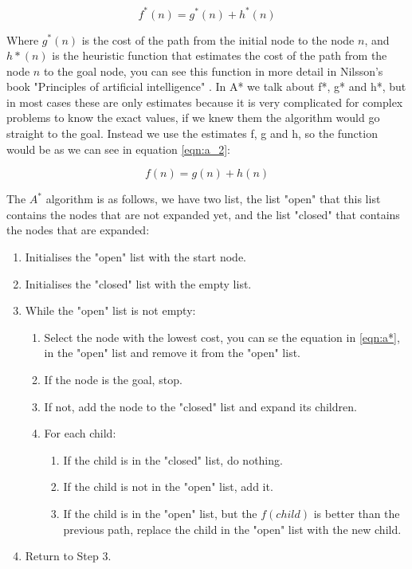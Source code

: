 \documentclass[runningheads]{llncs}
\begin{document}
\begin{equation}\label{eqn:a*}
f^*(n) = g^*(n) + h^*(n)
\end{equation}

Where \(g^*(n)\) is the cost of the path from the initial node to the node \(n\), and \(h*(n)\) is the heuristic function that estimates the cost of the path from the node \(n\) to the goal node, you can see this function in more detail in Nilsson's book "Principles of artificial intelligence" \cite{algorithms_4}.
In A* we talk about f*, g* and h*, but in most cases these are only estimates because it is very complicated for complex problems to know the exact values, if we knew them the algorithm would go straight to the goal. Instead we use the estimates f, g and h, so the function would be as we can see in equation \ref{eqn:a_2}:

\begin{equation}\label{eqn:a_2}
f(n) = g(n) + h(n)
\end{equation}

The \(A^*\) algorithm is as follows, we have two list, the list "open" that this list contains the nodes that are not expanded yet, and the list "closed" that contains the nodes that are expanded:

\begin{enumerate}
\item Initialises the "open" list with the start node.
\item Initialises the "closed" list with the empty list.
\item While the "open" list is not empty:
\begin{enumerate}
\item Select the node with the lowest cost, you can se the equation in \ref{eqn:a*}, in the "open" list and remove it from the "open" list.
\item If the node is the goal, stop.
\item If not, add the node to the "closed" list and expand its children.
\item For each child:
\begin{enumerate}
\item If the child is in the "closed" list, do nothing.
\item If the child is not in the "open" list, add it.
\item If the child is in the "open" list, but the \(f(child)\) is better than the previous path, replace the child in the "open" list with the new child.
\end{enumerate}
\end{enumerate}
\item Return to Step 3.
\end{enumerate}
\end{document}
